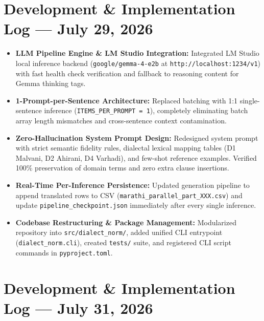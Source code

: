 \documentclass[10pt]{article}
\begin{document}
\section*{Development \& Implementation Log --- July 29, 2026}

\begin{itemize}
  \item \textbf{LLM Pipeline Engine \& LM Studio Integration:} Integrated LM Studio local inference backend (\texttt{google/gemma-4-e2b} at \texttt{http://localhost:1234/v1}) with fast health check verification and fallback to reasoning content for Gemma thinking tags.
  \item \textbf{1-Prompt-per-Sentence Architecture:} Replaced batching with 1:1 single-sentence inference (\texttt{ITEMS\_PER\_PROMPT = 1}), completely eliminating batch array length mismatches and cross-sentence context contamination.
  \item \textbf{Zero-Hallucination System Prompt Design:} Redesigned system prompt with strict semantic fidelity rules, dialectal lexical mapping tables (D1 Malvani, D2 Ahirani, D4 Varhadi), and few-shot reference examples. Verified 100\% preservation of domain terms and zero extra clause insertions.
  \item \textbf{Real-Time Per-Inference Persistence:} Updated generation pipeline to append translated rows to CSV (\texttt{marathi\_parallel\_part\_XXX.csv}) and update \texttt{pipeline\_checkpoint.json} immediately after every single inference.
  \item \textbf{Codebase Restructuring \& Package Management:} Modularized repository into \texttt{src/dialect\_norm/}, added unified CLI entrypoint (\texttt{dialect\_norm.cli}), created \texttt{tests/} suite, and registered CLI script commands in \texttt{pyproject.toml}.
\end{itemize}

\section*{Development \& Implementation Log --- July 31, 2026}
\end{document}
